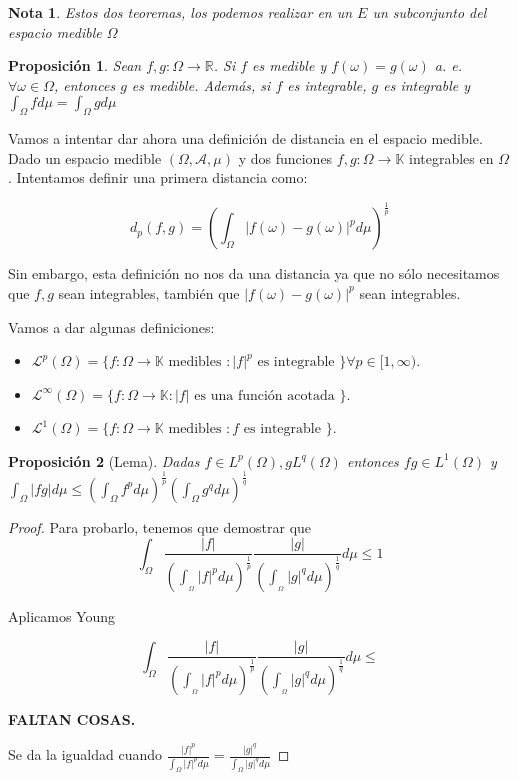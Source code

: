 \documentclass[11pt, a4paper]{article}
\providecommand{\abs}[1]{\lvert#1\rvert}
\newcommand{\R}{\mathbb{R}}
\theoremstyle{theorem-style}
\newtheorem{nprop}{Proposición}[section]
\theoremstyle{definition-style}
\theoremstyle{remark-style}
\newtheorem*{nota}{Nota}
\theoremstyle{example-style}
\begin{document}
\begin{nota}
  Estos dos teoremas, los podemos realizar en un $E$ un subconjunto del espacio medible $\Omega$
\end{nota}


\begin{nprop}
  Sean $f,g: \Omega \to \R$. Si $f$ es medible y $f(\omega) =  g(\omega)$ a. e. $\forall \omega \in \Omega$, entonces $g$ es medible. Además, si $f$ es integrable, $g$ es integrable y $\int_\Omega f d\mu = \int_\Omega g d\mu$
\end{nprop}


Vamos a intentar dar ahora una definición de distancia en el espacio medible. Dado un espacio medible $(\Omega, \mathcal A, \mu)$ y dos funciones $f, g: \Omega \rightarrow \mathbb K$ integrables en $\Omega$. Intentamos definir una primera distancia como:

$$d_p (f, g) = \left( \int_{\Omega} \abs{f(\omega) - g(\omega)}^p d \mu \right)^{\frac{1}{p}}$$

Sin embargo, esta definición no nos da una distancia ya que no sólo necesitamos que $f, g$ sean integrables, también que $\abs{f(\omega) - g(\omega)}^p$ sean integrables.

Vamos a dar algunas definiciones:

\begin{itemize}
\item $\mathcal L^p (\Omega) = \{ f: \Omega \rightarrow \mathbb K \text{ medibles } : \abs{f}^p \text{ es integrable } \} \forall p \in [1, \infty)$.
\item $\mathcal L^{\infty} (\Omega) = \{ f: \Omega \rightarrow \mathbb K : \abs{f} \text{ es una función acotada } \}$.
\item $\mathcal L^{1} (\Omega) = \{ f: \Omega \rightarrow \mathbb K \text{ medibles } : f \text{ es integrable } \}$. 
\end{itemize}

\begin{nprop}[Lema]
  Dadas $f \in L^p (\Omega), g L^q (\Omega)$ entonces $fg \in L^1 (\Omega)$ y $ \displaystyle \int_{\Omega} \abs{fg}d \mu \leq \left( \int_{\Omega} f^p d \mu \right)^{\frac{1}{p}}\left( \int_{\Omega} g^q d \mu \right)^{\frac{1}{q}}$
\end{nprop}

\begin{proof}
  Para probarlo, tenemos que demostrar que $$ \int_{\Omega} \frac{|f|}{\left( \int_{_\Omega} |f|^p d \mu \right)^{\frac{1}{p}}} \frac{|g|}{\left( \int_{_\Omega} |g|^q d \mu \right)^{\frac{1}{q}}} d \mu \leq 1$$
  
  Aplicamos Young
  
  $$\int_{\Omega} \frac{|f|}{\left( \int_{_\Omega} |f|^p d \mu \right)^{\frac{1}{p}}} \frac{|g|}{\left( \int_{_\Omega} |g|^q d \mu \right)^{\frac{1}{q}}} d \mu \leq $$
  
  \textbf{FALTAN COSAS.}
  
  Se da la igualdad cuando $\displaystyle \frac{|f|^p}{\int_{\Omega} |f|^p d \mu } = \frac{|g|^q}{\int_{\Omega} |g|^q d \mu }$
\end{proof}
\end{document}
